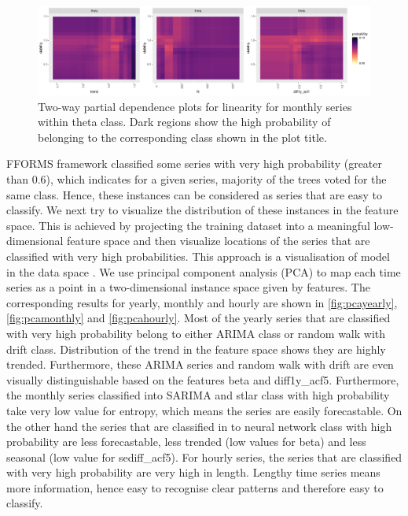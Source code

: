 \documentclass[11pt,a4paper,]{article}
\begin{document}
\begin{figure}[h]

{\centering \includegraphics[width=\textwidth]{figure/thetapdp-1} 

}

\caption{Two-way partial dependence plots for linearity for monthly series within theta class. Dark regions show the high probability of belonging to the corresponding class shown in the plot title.}\label{fig:thetapdp}
\end{figure}

FFORMS framework classified some series with very high probability (greater than 0.6), which indicates for a given series, majority of the trees voted for the same class. Hence, these instances can be considered as series that are easy to classify. We next try to visualize the distribution of these instances in the feature space. This is achieved by projecting the training dataset into a meaningful low-dimensional feature space and then visualize locations of the series that are classified with very high probabilities. This approach is a visualisation of model in the data space \autocite{wickham2015visualizing}. We use principal component analysis (PCA) to map each time series as a point in a two-dimensional instance space given by features. The corresponding results for yearly, monthly and hourly are shown in \autoref{fig:pcayearly}, \autoref{fig:pcamonthly} and \autoref{fig:pcahourly}. Most of the yearly series that are classified with very high probability belong to either ARIMA class or random walk with drift class. Distribution of the trend in the feature space shows they are highly trended. Furthermore, these ARIMA series and random walk with drift are even visually distinguishable based on the features beta and diff1y\_acf5. Furthermore, the monthly series classified into SARIMA and stlar class with high probability take very low value for entropy, which means the series are easily forecastable. On the other hand the series that are classified in to neural network class with high probability are less forecastable, less trended (low values for beta) and less seasonal (low value for sediff\_acf5). For hourly series, the series that are classified with very high probability are very high in length. Lengthy time series means more information, hence easy to recognise clear patterns and therefore easy to classify.
\end{document}
